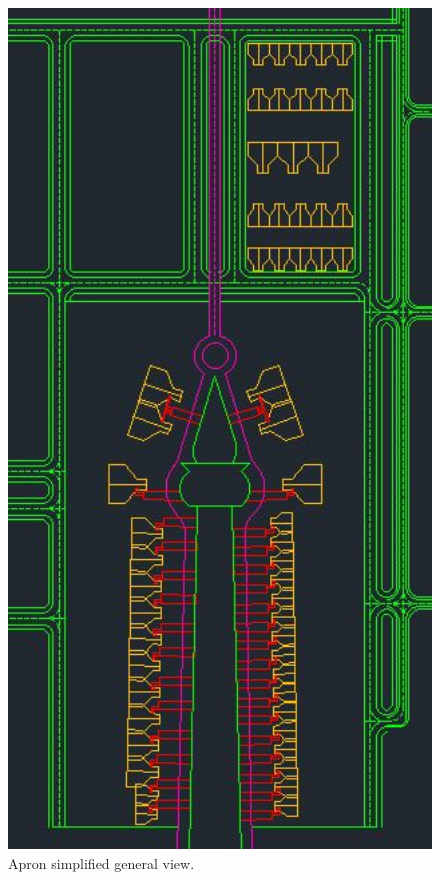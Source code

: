 	\begin{figure}[H]
		\centering
		\includegraphics[clip, trim=0cm 0cm 0cm 0cm, angle=270, width=1\textwidth]{./images/serviceway/apronview}
		\caption{Apron simplified general view.} %
		\label{} %
	\end{figure}
	
